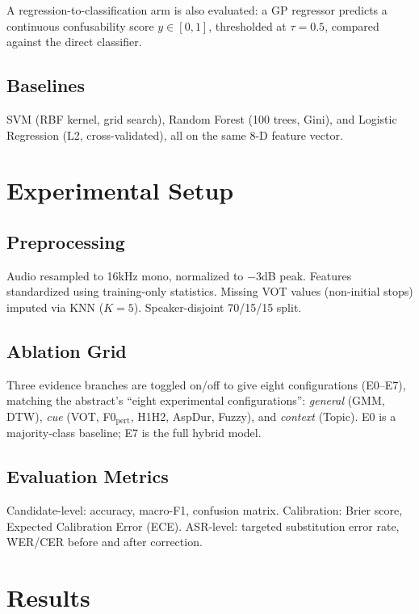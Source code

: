\documentclass[10pt,conference]{IEEEtran}
\begin{document}
A regression-to-classification arm is also evaluated: a GP regressor
predicts a continuous confusability score $y \in [0,1]$, thresholded at
$\tau=0.5$, compared against the direct classifier.

\subsection{Baselines}
SVM (RBF kernel, grid search), Random Forest (100 trees, Gini), and
Logistic Regression (L2, cross-validated), all on the same 8-D feature
vector.

\section{Experimental Setup}

\subsection{Preprocessing}
Audio resampled to 16kHz mono, normalized to $-3$dB peak. Features
standardized using training-only statistics. Missing VOT values (non-initial
stops) imputed via KNN ($K=5$). Speaker-disjoint 70/15/15 split.

\subsection{Ablation Grid}
Three evidence branches are toggled on/off to give eight configurations
(E0--E7), matching the abstract's ``eight experimental configurations'':
\emph{general} (GMM, DTW), \emph{cue} (VOT, F0$_{\text{pert}}$, H1H2,
AspDur, Fuzzy), and \emph{context} (Topic). E0 is a majority-class
baseline; E7 is the full hybrid model.

\subsection{Evaluation Metrics}
Candidate-level: accuracy, macro-F1, confusion matrix. Calibration:
Brier score, Expected Calibration Error (ECE). ASR-level: targeted
substitution error rate, WER/CER before and after correction.

\section{Results}
\end{document}

